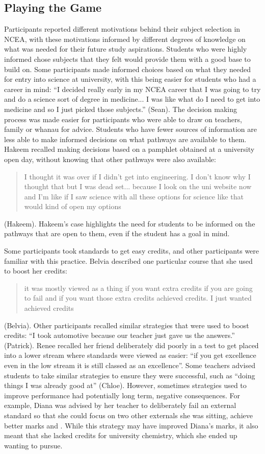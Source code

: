 \documentclass[a4paper,man,natbib]{apa6}
\begin{document}
\subsection{Playing the Game}
Participants reported different motivations behind their subject selection in NCEA, with these motivations informed by different degrees of knowledge on what was needed for their future study aspirations. Students who were highly informed chose subjects that they felt would provide them with a good base to build on. Some participants made informed choices based on what they needed for entry into science at university, with this being easier for students who had a career in mind: ``I decided really early in my NCEA career that I was going to try and do a science sort of degree in medicine... I was like what do I need to get into medicine and so I just picked those subjects.'' (Sean). The decision making process was made easier for participants who were able to draw on teachers, family or whanau for advice. Students who have fewer sources of information are less able to make informed decisions on what pathways are available to them. Hakeem recalled making decisions based on a pamphlet obtained at a university open day, without knowing that other pathways were also available: \blockquote{I thought it was over if I didn't get into engineering. I don’t know why I thought that but I was dead set... because I look on the uni website now and I'm like if I saw science with all these options for science like that would kind of open my options} (Hakeem). Hakeem's case highlights the need for students to be informed on the pathways that are open to them, even if the student has a goal in mind. 
 
Some participants took standards to get easy credits, and other participants were familiar with this practice. Belvia described one particular course that she used to boost her credits: \blockquote{it was mostly viewed as a thing if you want extra credits if you are going to fail and if you want those extra credits achieved credits. I just wanted achieved credits} (Belvia). Other participants recalled similar strategies that were used to boost credits: ``I took automotive because our teacher just gave us the answers.'' (Patrick). Renee recalled her friend deliberately did poorly in a test to get placed into a lower stream where standards were viewed as easier: ``if you get excellence even in the low stream it is still classed as an excellence''. Some teachers advised students to take similar strategies to ensure they were successful, such as ``doing things I was already good at'' (Chloe). However, sometimes strategies used to improve performance had potentially long term, negative consequences. For example, Diana was advised by her teacher to deliberately fail an external standard so that she could focus on two other externals she was sitting, achieve better marks and . While this strategy may have improved Diana's marks, it also meant that she lacked credits for university chemistry, which she ended up wanting to pursue. 
\end{document}
